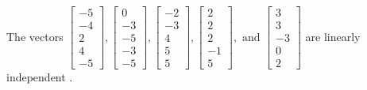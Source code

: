 \begin{exercise}
\begin{exerciseStatement}
  \end{exerciseStatement}
  \begin{exerciseAnswer}
   The vectors \(\left[\begin{array}{r}
-5 \\
-4 \\
2 \\
4 \\
-5
\end{array}\right] , \left[\begin{array}{r}
0 \\
-3 \\
-5 \\
-3 \\
-5
\end{array}\right] , \left[\begin{array}{r}
-2 \\
-3 \\
4 \\
5 \\
5
\end{array}\right] , \left[\begin{array}{r}
2 \\
2 \\
2 \\
-1 \\
5
\end{array}\right] , \text{ and } \left[\begin{array}{r}
3 \\
3 \\
-3 \\
0 \\
2
\end{array}\right]\) are 
  	 linearly independent  .
  


  \end{exerciseAnswer}
\end{exercise}